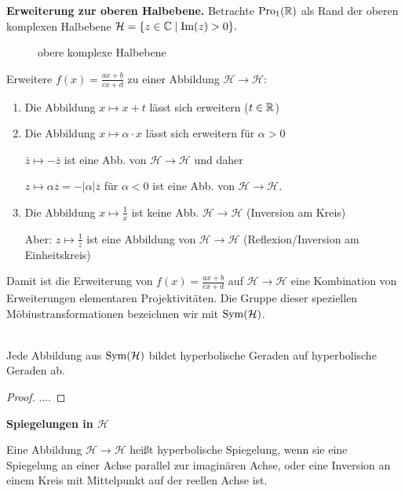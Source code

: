   
  \textbf{Erweiterung zur oberen Halbebene.} Betrachte $\operatorname{Pro}_1(\mathbb R)$ als Rand der oberen komplexen Halbebene 
  $\mathcal{H}=\lbrace z\in \mathbb C \mid \operatorname{Im}(z) >0 \rbrace.$
  \begin{figure}[h]
    
    \caption{obere komplexe Halbebene}
  \end{figure}
  Erweitere $\displaystyle{f(x)=\frac{ax+b}{cx+d}}$ zu einer Abbildung $\mathcal{H}\to \mathcal{H}$:
  \begin{enumerate}[(1)]
    \item Die Abbildung $x\mapsto x+t$ lässt sich erweitern ($t\in \mathbb R$)
    \item Die Abbildung $x\mapsto \alpha \cdot x$ lässt sich erweitern für $\alpha > 0$ \par
          $\overline{z} \mapsto -\overline{z}$ ist eine Abb. von $\mathcal{H} \to \mathcal{H}$ und daher \par
          $ z\mapsto \alpha \overline{z}=-\lvert \alpha \rvert \overline{z}$ für $\alpha < 0$ ist eine Abb. 
          von $\mathcal{H}\to \mathcal{H}$.
    \item Die Abbildung $x \mapsto \frac{1}{x}$ ist keine Abb. $\mathcal{H}\to \mathcal{H}$ (Inversion am Kreis) \par
          Aber: $z\mapsto \frac{1}{\overline{z}}$ ist eine Abbildung von $\mathcal{H}\to \mathcal{H}$ (Reflexion/Inversion am Einheitskreis)

  \end{enumerate}
  
  Damit ist die Erweiterung von $\displaystyle{f(x)=\frac{ax+b}{cx+d}}$ auf $\mathcal{H}\to \mathcal{H}$ eine Kombination von Erweiterungen elementaren Projektivitäten. 
  Die Gruppe dieser speziellen Möbiustransformationen bezeichnen wir mit $\operatorname{Sym}(\mathcal{H})$.
  
  \begin{thm} \ \\
    Jede Abbildung aus $\operatorname{Sym}(\mathcal{H})$ bildet hyperbolische Geraden auf hyperbolische Geraden ab.
  \end{thm}
  \begin{proof}
   ....
  \end{proof}

  \textbf{Spiegelungen in $\mathcal{H}$} 
  \begin{defi}
    Eine Abbildung $\mathcal{H}\to \mathcal{H}$ heißt hyperbolische Spiegelung, wenn sie eine Spiegelung an einer Achse parallel zur imaginären Achse, oder eine 
    Inversion an einem Kreis mit Mittelpunkt auf der reellen Achse ist.
  \end{defi}
  

